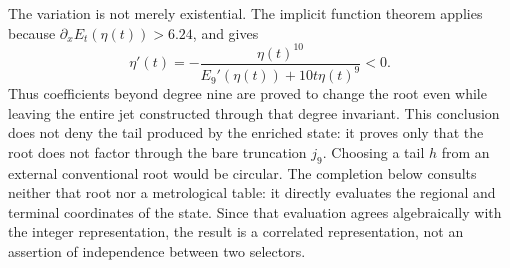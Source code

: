 The variation is not merely existential. The implicit function theorem
applies because \(\partial_xE_t(\eta(t))>6.24\), and gives
\begin{equation}
 \eta'(t)=-
 \frac{\eta(t)^{10}}
 {E_9'(\eta(t))+10t\eta(t)^9}<0.
 \label{eq:alpha-variacion-raiz-prolongacion}
\end{equation}
Thus coefficients beyond degree nine are proved to change the root
even while leaving the entire jet constructed through that degree invariant.
This conclusion does not deny the tail produced by the enriched state:
it proves only that the root does not factor through the bare truncation
\(j_9\). Choosing a tail \(h\) from an external conventional root
would be circular. The completion below consults neither that root nor a
metrological table: it directly evaluates the regional and terminal coordinates
of the state. Since that evaluation agrees algebraically with the integer
representation, the result is a correlated representation, not an assertion
of independence between two selectors.


\endinput

\subsubsection{Complete reader, naturality, and common cylinders}

Let \(F_{\mathsf s}\) be the coefficient field of the signature of
\(\mathsf s\in\mathcal X_\alpha^{\mathrm{enr}}\), and let \(d_m=6+3m\).
Define
\[
 \mathfrak J_m:=\coprod_{\mathsf s\in\mathcal X_\alpha^{\mathrm{enr}}}
 \{\mathsf s\}\times F_{\mathsf s}[X]/(X^{d_m+1}),\qquad
 \Gamma_m(\mathsf s)=
 \bigl(\mathsf s,E_{21/22}^{(d_m)}(\mathsf s;X)\bigr).
\]
The registered complete reader \(\Gamma_{E21}\) produces these representations.
For \(m'\ge m\), truncation
\(
 \tau_{m',m}(\mathsf s,[f]_{d_{m'}})
 =(\mathsf s,[f]_{d_m})
\)
satisfies
\begin{equation}
 \tau_{m',m}\circ\Gamma_{m'}=\Gamma_m,
 \qquad
 E_{21/22}:=\varprojlim_mE_{21/22}^{(d_m)}.
 \tag{A3}
 \label{eq:alpha-sistema-analitico-completo}
\end{equation}
No section of bare truncation is added. When the representation
of the next three coefficients is made explicit, it is the derived
projection
\[
 \Lambda_{d_m+1:d_m+3}
 :=\operatorname{pr}_{d_m+1:d_m+3}\circ
   \Gamma_{E21}\circ\mathcal U_{\mathrm{TPK}},
\]
not an independent generator or a reading of the target value.

